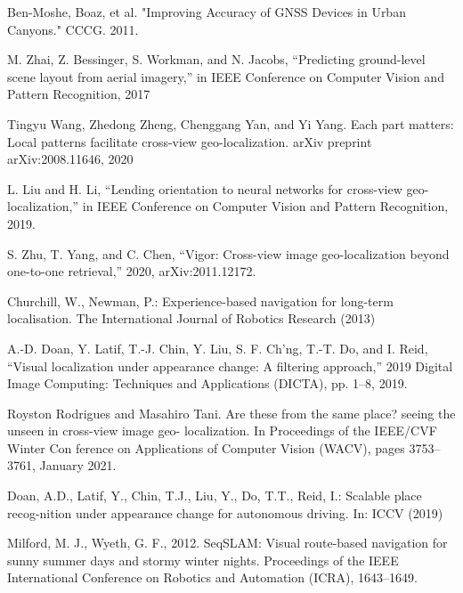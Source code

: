 \documentclass[10pt,letterpaper]{article}
\begin{document}
%
%
% 
\begin{thebibliography}{10}
  Ben-Moshe, Boaz, et al. "Improving Accuracy of GNSS Devices in Urban Canyons." CCCG. 2011.
  
  M. Zhai, Z. Bessinger, S. Workman, and N. Jacobs, “Predicting ground-level scene layout from aerial imagery,” in IEEE Conference on Computer Vision and Pattern Recognition, 2017
  
  Tingyu Wang, Zhedong Zheng, Chenggang Yan, and Yi Yang. Each part matters: Local patterns facilitate cross-view geo-localization. arXiv preprint arXiv:2008.11646, 2020
  
  L. Liu and H. Li, “Lending orientation to neural networks for cross-view geo-localization,” in IEEE Conference on Computer Vision and Pattern Recognition, 2019.
  
  S. Zhu, T. Yang, and C. Chen, “Vigor: Cross-view image geo-localization beyond one-to-one retrieval,” 2020, arXiv:2011.12172.
  
  Churchill, W., Newman, P.: Experience-based navigation for long-term localisation. The International Journal of Robotics Research (2013)
  
  A.-D. Doan, Y. Latif, T.-J. Chin, Y. Liu, S. F. Ch’ng, T.-T. Do, and I. Reid, “Visual localization under appearance change: A filtering approach,” 2019 Digital Image Computing: Techniques and Applications (DICTA), pp. 1–8, 2019.
  
  Royston Rodrigues and Masahiro Tani. Are these from the same place? seeing the unseen in cross-view image geo- localization. In Proceedings of the IEEE/CVF Winter Con ference on Applications of Computer Vision (WACV), pages 3753–3761, January 2021.
  
  Doan, A.D., Latif, Y., Chin, T.J., Liu, Y., Do, T.T., Reid, I.: Scalable place recog-nition under appearance change for autonomous driving. In: ICCV (2019)
  
  Milford, M. J., Wyeth, G. F., 2012. SeqSLAM: Visual route-based navigation for sunny summer days and stormy winter nights. Proceedings of the IEEE International Conference on Robotics and Automation (ICRA), 1643–1649.
  

\end{thebibliography}
\end{document}
